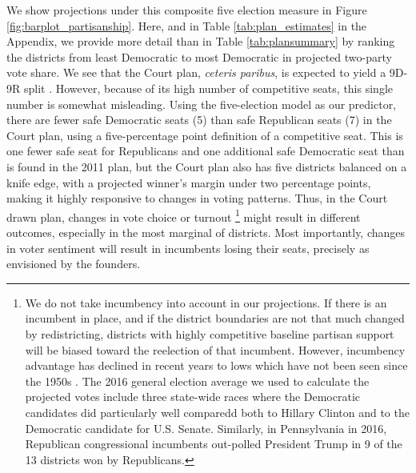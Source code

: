                    
\par
We show projections under this composite five election measure in Figure \ref{fig:barplot_partisanship}.  Here, and in Table \ref{tab:plan_estimates} in the Appendix, we provide more detail than in Table \ref{tab:plansummary} by ranking the districts from least Democratic to most Democratic in projected two-party vote share. We see that the Court plan, \textit{ceteris paribus}, is expected to yield a 9D-9R split . However, because of its high number of competitive seats, this single number is somewhat misleading. Using the five-election model as our predictor, there are fewer safe Democratic seats (5) than safe Republican seats (7) in the Court plan, using a five-percentage point definition of a competitive seat. This is one fewer safe seat for Republicans and one additional safe Democratic seat than is found in the 2011 plan, but the Court plan also has five districts balanced on a knife edge, with a projected winner’s margin under two percentage points, making it highly responsive to changes in voting patterns. Thus, in the Court drawn plan, changes in vote choice or turnout
        \footnote{We do not take incumbency into account in our projections. If there is an incumbent in place, and if the district boundaries are not that much changed by redistricting, districts with highly competitive baseline partisan support will be biased toward the reelection of that incumbent. However, incumbency advantage has declined in recent years to lows which have not been seen since the 1950s \citep{Jacobson2015}. The 2016 general election average we used to calculate the projected votes include three state-wide races where the Democratic candidates did particularly well comparedd both to Hillary Clinton and to the Democratic candidate for U.S. Senate. Similarly, in Pennsylvania in 2016, Republican congressional incumbents out-polled President Trump in 9 of the 13 districts won by Republicans.}
might result in different outcomes, especially in the most marginal of districts.  Most importantly, changes in voter sentiment will result in incumbents losing their seats,  precisely as envisioned by the founders.
